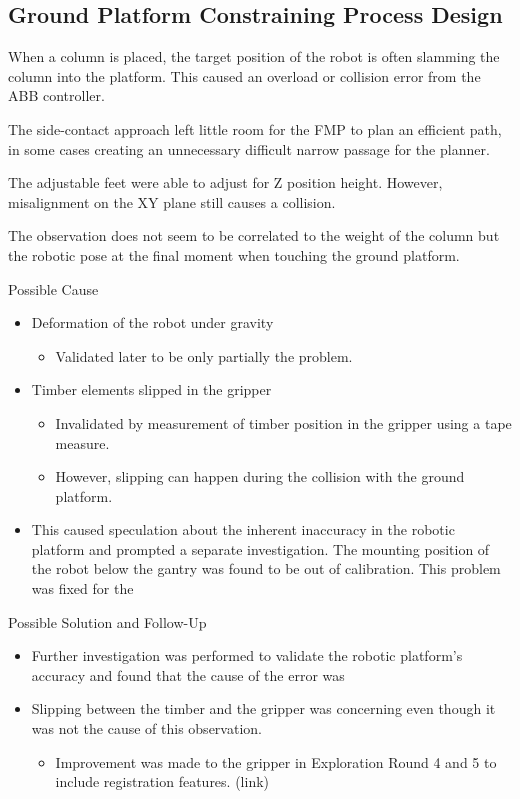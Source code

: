 \subsection{Ground Platform Constraining Process Design}
\label{subsection:exploration_2_ground_platform_constraining_process_design}

When a column is placed, the target position of the robot is often slamming the column into the platform. This caused an overload or collision error from the ABB controller.

The side-contact approach left little room for the FMP to plan an efficient path, in some cases creating an unnecessary difficult narrow passage for the planner.


The adjustable feet were able to adjust for Z position height. However, misalignment on the XY plane still causes a collision.

The observation does not seem to be correlated to the weight of the column but the robotic pose at the final moment when touching the ground platform.

Possible Cause
\begin{itemize}
    \item Deformation of the robot under gravity
    \begin{itemize}
        \item Validated later to be only partially the problem. 
    \end{itemize}
    \item Timber elements slipped in the gripper
    \begin{itemize}
        \item Invalidated by measurement of timber position in the gripper using a tape measure. 
        \item However, slipping can happen during the collision with the ground platform.
    \end{itemize}
    \item This caused speculation about the inherent inaccuracy in the robotic platform and prompted a separate investigation. The mounting position of the robot below the gantry was found to be out of calibration. This problem was fixed for the 
\end{itemize}

Possible Solution and Follow-Up
\begin{itemize}
    \item Further investigation was performed to validate the robotic platform’s accuracy and found that the cause of the error was 
    \item Slipping between the timber and the gripper was concerning even though it was not the cause of this observation. 
    \begin{itemize}
        \item Improvement was made to the gripper in Exploration Round 4 and 5 to include registration features. (link)
    \end{itemize}
\end{itemize}


